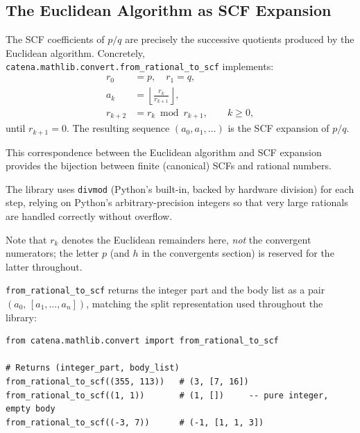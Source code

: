 \subsection{The Euclidean Algorithm as SCF Expansion\texorpdfstring{\protect\footnotemark}{}}


The SCF coefficients of $p/q$ are precisely the successive quotients produced by the
Euclidean algorithm.
Concretely, \texttt{catena.mathlib.convert.from\_rational\_to\_scf} implements:
\begin{align*}
  r_0 &= p,\quad r_1 = q, \\
  a_k &= \left\lfloor \frac{r_k}{r_{k+1}} \right\rfloor, \\
  r_{k+2} &= r_k \bmod r_{k+1}, \qquad k \geq 0,
\end{align*}
until $r_{k+1} = 0$.  The resulting sequence $(a_0, a_1, \ldots)$ is the SCF expansion of
$p/q$.

\begin{remark}
This correspondence between the Euclidean algorithm and SCF expansion provides the bijection
between finite (canonical) SCFs and rational numbers.

The library uses \texttt{divmod} (Python's built-in, backed by hardware division) for each
step, relying on Python's arbitrary-precision integers so that very large rationals are
handled correctly without overflow.

Note that $r_k$ denotes the Euclidean remainders here, \emph{not} the convergent numerators;
the letter $p$ (and $h$ in the convergents section) is reserved for the latter throughout.
\end{remark}

\texttt{from\_rational\_to\_scf} returns the integer part and the body list as a pair
$(a_0,\,[a_1, \ldots, a_n])$, matching the split representation used throughout the library:

\begin{catenadef}
\begin{lstlisting}[style=python]
from catena.mathlib.convert import from_rational_to_scf

# Returns (integer_part, body_list)
from_rational_to_scf((355, 113))   # (3, [7, 16])
from_rational_to_scf((1, 1))       # (1, [])     -- pure integer, empty body
from_rational_to_scf((-3, 7))      # (-1, [1, 1, 3])
\end{lstlisting}
\end{catenadef}

